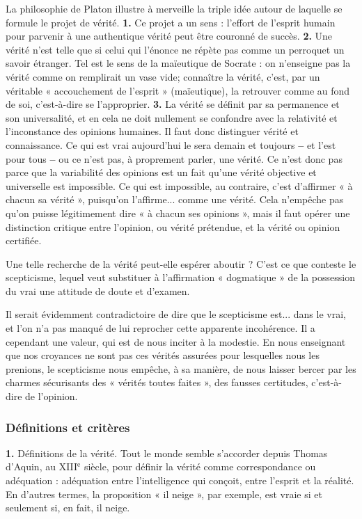 La philosophie de Platon illustre à merveille
la triple idée autour de laquelle se
formule le projet de vérité. {\bf 1.} Ce projet a
un sens : l'effort de l'esprit humain pour
parvenir à une authentique vérité peut
être couronné de succès. {\bf 2.} Une vérité
n'est telle que si celui qui l'énonce ne
répète pas comme un perroquet un savoir
étranger. Tel est le sens de la maïeutique
de Socrate : on n’enseigne pas la vérité
comme on remplirait un vase vide;
connaître la vérité, c'est, par un véritable
« accouchement de l'esprit » (maïeutique),
la retrouver comme au fond de soi, c’est-à-dire
se l’approprier. {\bf 3.} La vérité se définit
par sa permanence et son universalité,
et en cela ne doit nullement se confondre
avec la relativité et l’inconstance des opinions
humaines. Il faut donc distinguer
vérité et connaissance. Ce qui est vrai
aujourd’hui le sera demain et toujours {\bf --}
et l’est pour tous {\bf --} ou ce n’est pas, à
proprement parler, une vérité. Ce n'est
donc pas parce que la variabilité des opinions
est un fait qu’une vérité objective et
universelle est impossible. Ce qui est
impossible, au contraire, c'est d'affirmer
« à chacun sa vérité », puisqu'on l’affirme...
comme une vérité. Cela n’empêche
pas qu’on puisse légitimement dire
« à chacun ses opinions », mais il faut opérer
une distinction critique entre l’opinion,
ou vérité prétendue, et la vérité ou
opinion certifiée.

Une telle recherche de la vérité peut-elle
espérer aboutir ? C’est ce que conteste le
scepticisme, lequel veut substituer à
l'affirmation « dogmatique » de la possession
du vrai une attitude de doute et
d'examen.

Il serait évidemment contradictoire de
dire que le scepticisme est... dans le vrai,
et l’on n’a pas manqué de lui reprocher
cette apparente incohérence. Il a cependant
une valeur, qui est de nous inciter à
la modestie. En nous enseignant que nos
croyances ne sont pas ces vérités assurées
pour lesquelles nous les prenions, le
scepticisme nous empêche, à sa manière,
de nous laisser bercer par les charmes
sécurisants des « vérités toutes faites », des
fausses certitudes, c'est-à-dire de l’opinion.

\subsubsection{Définitions et critères}

{\bf 1.} Définitions de la vérité. Tout le monde
semble s'accorder depuis Thomas
d’Aquin, au {\footnotesize XIII}$^\text{e}$ siècle, pour définir la
vérité comme correspondance ou adéquation :
adéquation entre l'intelligence
qui conçoit, entre l'esprit et la réalité. En
d’autres termes, la proposition « il neige »,
par exemple, est vraie si et seulement si,
en fait, il neige.

